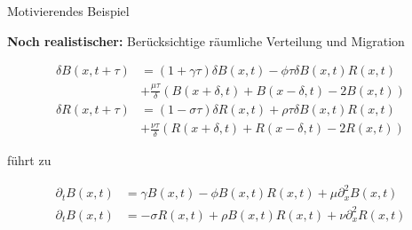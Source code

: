 \documentclass[compress,xcolor=table]{beamer}
\begin{document}
\begin{frame}{Motivierendes Beispiel}

\small
\textbf{Noch realistischer:} Berücksichtige räumliche Verteilung und
Migration

\begin{align*}
\delta B(x,t+\tau) &= (1+\gamma\tau) \delta B(x,t) - \phi\tau \delta B(x,t)R(x,t) \\&+
\frac{\mu\tau}{\delta}
\left(B(x+\delta,t)+B(x-\delta,t)-2B(x,t)\right) \\
\delta R(x,t+\tau) &= (1-\sigma\tau) \delta R(x,t) +\rho\tau \delta B(x,t)R(x,t) \\&+
\frac{\nu\tau}{\delta}
\left(R(x+\delta,t)+R(x-\delta,t)-2R(x,t)\right)
\end{align*}

führt zu

\begin{align*}
\partial_t B(x,t) &= \gamma B(x,t)-\phi B(x,t)R(x,t) + \mu \partial_x^2 B(x,t) \\
\partial_t B(x,t) &= -\sigma R(x,t)+\rho B(x,t)R(x,t) + \nu \partial_x^2 R(x,t)
\end{align*}


\end{frame}
\end{document}

